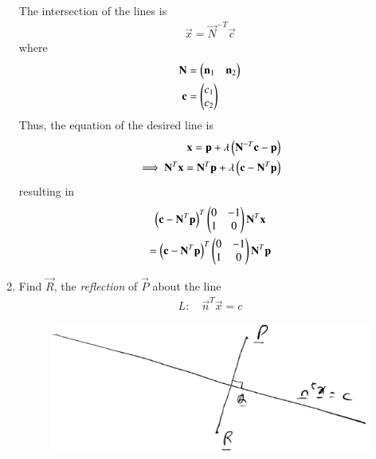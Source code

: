 \begin{enumerate}[label=\arabic*.,ref=\thesubsection.\theenumi]
%
%
%
The intersection of the lines is 
\begin{align}
\vec{x} = \vec{N}^{-T}\vec{c}
\end{align}
%
where 
\begin{align}
\mathbf{N} &= \begin{pmatrix}\mathbf{n}_1 &\mathbf{n}_2\end{pmatrix}
\\
\mathbf{c} &= \begin{pmatrix}c_1 \\ c_2\end{pmatrix} 
\end{align}
Thus, the equation of the desired line is 
\begin{align}
\mathbf{x} = \mathbf{p}+ \lambda\left(\mathbf{N}^{-T}\mathbf{c}-\mathbf{p}\right)&
\\
\implies \mathbf{N}^{T}\mathbf{x} = \mathbf{N}^{T}\mathbf{p}+ \lambda\left(\mathbf{c}-\mathbf{N}^{T}\mathbf{p}\right)&
\end{align}
resulting in 
\begin{multline}
 \left(\mathbf{c}-\mathbf{N}^T\mathbf{p}\right)^T\begin{pmatrix}0 & -1 \\ 1 & 0\end{pmatrix}\mathbf{N}^T\mathbf{x} 
\\
= \left(\mathbf{c}-\mathbf{N}^T\mathbf{p}\right)^T\begin{pmatrix}0 & -1 \\ 1 & 0\end{pmatrix}\mathbf{N}^T\mathbf{p}
\end{multline}
\item Find $\vec{R}$, the {\em reflection}  of $\vec{P}$ about the line
\begin{align}
L: \quad \vec{n}^T\vec{x} = c
\end{align}
%
\begin{figure}
\centering
\includegraphics[width=\columnwidth]{./line/figs/reflection.eps}

\end{figure}
\end{enumerate}
